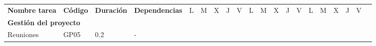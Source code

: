 \begin{longtable}[c]{llclllllllllllllllll}
        \multicolumn{1}{|c|}{\multirow{-2}{*}{\textbf{Nombre tarea}}}                         & \multicolumn{1}{c|}{\multirow{-2}{*}{\textbf{Código}}}                         & \multicolumn{1}{c|}{\multirow{-2}{*}{\textbf{Duración}}}                         & \multicolumn{1}{c|}{\multirow{-2}{*}{\textbf{Dependencias}}}                         & \multicolumn{1}{l|}{L}          & \multicolumn{1}{l|}{M}          & \multicolumn{1}{l|}{X}          & \multicolumn{1}{l|}{J}          & \multicolumn{1}{l|}{V}          & \multicolumn{1}{l|}{L}          & \multicolumn{1}{l|}{M}          & \multicolumn{1}{l|}{X}          & \multicolumn{1}{l|}{J}          & \multicolumn{1}{l|}{V}          & \multicolumn{1}{l|}{L}          & \multicolumn{1}{l|}{M}          & \multicolumn{1}{l|}{X}          & \multicolumn{1}{l|}{J}          & \multicolumn{1}{l|}{V}                        &  \\ \cline{1-19}
        \multicolumn{4}{|l|}{\textbf{Gestión del proyecto}}                                                                                                                                                                                                                                                                                              & \multicolumn{15}{l|}{}                                                                                                                                                                                                                                                                                                                                                                                                                                                                                                                    &  \\ \cline{1-19}
        \multicolumn{1}{|l|}{Reuniones}                                                       & \multicolumn{1}{l|}{GP05}                                                      & \multicolumn{1}{l|}{0.2}                                                         & \multicolumn{1}{l|}{-}                                                               &                                 &                                 &                                 &                                 &                                 &                                 &                                 &                                 & \cellcolor[HTML]{EF8787}        &                                 &                                 &                                 &                                 &                                 & \multicolumn{1}{l|}{}                         &  \\ \cline{1-4}

\end{longtable}
